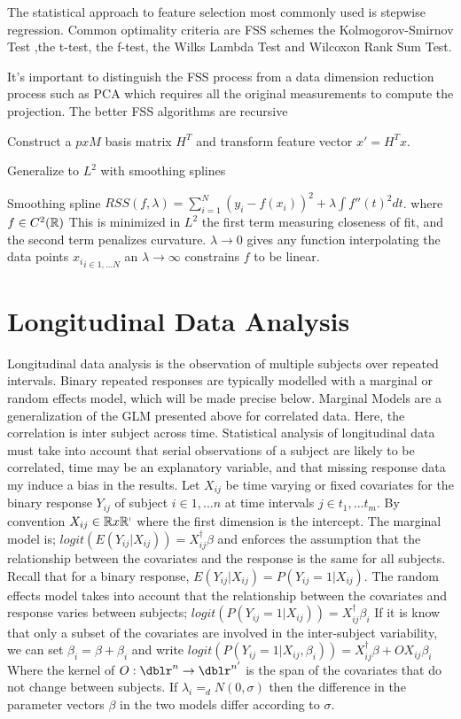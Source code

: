 The statistical approach to feature selection most commonly used is stepwise regression.  Common optimality criteria are FSS schemes the Kolmogorov-Smirnov Test ,the t-test, the f-test, the Wilks Lambda Test and Wilcoxon Rank Sum Test.

It's important to distinguish the FSS process from a data dimension reduction process such as PCA which requires all the original measurements to compute the projection. The better FSS algorithms are recursive

Construct a $p x M$ basis matrix $H^{T}$ and transform feature vector $x' = H^{T} x$.


Generalize to $L^{2}$ with smoothing splines

Smoothing spline $RSS(f,\lambda)= \sum\limits_{i=1}^{N} (y_{i} -f(x_{i}) )^{2} + \lambda \int f''(t)^{2} dt$. where $f \in C^{2}(\mathbb{R} )$ This is minimized in $L^{2}$ the first term measuring closeness of fit, and the second term penalizes curvature. $\lambda \rightarrow 0$ gives any function interpolating the data points ${x_i}_{i  \in {1, ... N} } $ an $\lambda \rightarrow \infty$ constrains $f$ to be linear.

\section*{Longitudinal Data Analysis} Longitudinal data analysis is the observation of multiple subjects over repeated intervals. Binary repeated responses are typically modelled with a marginal or random effects model, which will be made precise below. Marginal Models are a generalization of the GLM presented above for correlated data.  Here, the correlation is inter subject across time.  Statistical analysis of longitudinal data must take into account that serial observations of a subject are likely to be correlated, time may be an explanatory variable, and that missing response data my induce a bias in the results.  Let ${X_{ij}}$ be time varying or fixed covariates for the binary response ${Y_{ij}}$ of subject $i \in {1,...n}$ at time intervals $j \in {t_1,...t_m}$. By convention $X_{ij} \in \mathbb{R} x \mathbb{R^p}$ where the first dimension is the intercept. The marginal model is; $logit (E(Y_{ij} | X_{ij}) ) = X_{ij}^{\dagger} \beta$ and enforces the assumption that the relationship between the covariates and the response is the same for all subjects. Recall that for a binary response, $E(Y_{ij} | X_{ij}) = P(Y_{ij}=1 | X_{ij})$.  The random effects model takes into account that the relationship between the covariates and response varies between subjects; $logit (P(Y_{ij}=1 | X_{ij}) ) = X_{ij}^{\dagger} \beta_i$ If it is know that only a subset of the covariates are involved in the inter-subject variability, we can set $\beta_i= \beta + \beta_i$ and write $logit (P(Y_{ij}=1 | X_{ij}, \beta_i) ) = X_{ij}^{\dagger} \beta + O X_{ij} \beta_i$ Where the kernel of $O : \dblr^n \rightarrow \dblr^{n'}$ is the span of the covariates that do not change between subjects.  If $\lambda_i =_d N(0,\sigma)$ then the difference in the parameter vectors $\beta$ in the two models differ according to $\sigma$.

